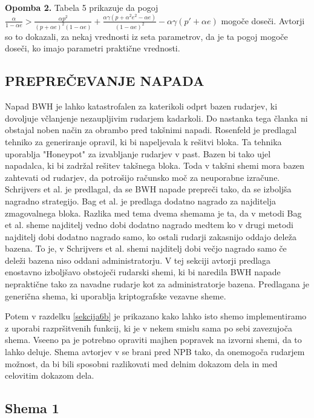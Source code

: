 \documentclass{acm_proc_article-sp}
\begin{document}
\textbf{Opomba 2.} Tabela 5 prikazuje da pogoj \textit{$\frac{\alpha}{1-\alpha e} > \frac{\alpha p^2}{(p+\alpha e)^2(1-\alpha e)} + \frac{\alpha\gamma(p+\alpha^2e^2-\alpha e)}{(1-\alpha e)^2} - \alpha\gamma(p' +\alpha e)$} mogoče doseči. Avtorji so to dokazali, za nekaj vrednosti iz seta parametrov, da je ta pogoj mogoče doseči, ko imajo parametri praktične vrednosti.

\subsection{PREPREČEVANJE NAPADA}

Napad BWH je lahko katastrofalen za katerikoli odprt bazen rudarjev, ki dovoljuje včlanjenje nezaupljivim rudarjem kadarkoli. Do nastanka tega članka ni obstajal noben način za obrambo pred takšnimi napadi. Rosenfeld \cite{analysisofbitcoin} je predlagal tehniko za generiranje opravil, ki bi napeljevala k rešitvi bloka. Ta tehnika uporablja "Honeypot" za izvabljanje  rudarjev v past. Bazen bi tako ujel napadalca, ki bi zadržal rešitev takšnega bloka. Toda v takšni shemi mora bazen zahtevati od rudarjev, da potrošijo računsko moč za neuporabne izračune. Schrijvers et al. \cite{incentivecompabiliti} je  predlagal, da se BWH napade prepreči tako, da se izboljša nagradno strategijo. Bag et al. \cite{noteonblockattack} je predlaga dodatno nagrado za najditelja zmagovalnega bloka. Razlika med tema dvema shemama je ta, da v metodi Bag et al. sheme najditelj vedno dobi dodatno nagrado medtem ko v drugi metodi najditelj dobi dodatno nagrado samo, ko ostali rudarji zakasnijo oddajo deleža bazena. To je, v Schrijvers et al. shemi najditelj dobi večjo nagrado samo če deleži bazena niso oddani administratorju. V tej sekciji avtorji predlaga enostavno izboljšavo obstoječi rudarski shemi, ki bi naredila BWH napade nepraktične tako za navadne rudarje kot za administratorje bazena. Predlagana je generična shema, ki uporablja kriptografske vezavne sheme.

Potem v razdelku \ref{sekcija6b} je prikazano kako lahko isto shemo implementiramo z uporabi razpršitvenih funkcij, ki je v nekem smislu sama po sebi zavezujoča shema. Vseeno pa je potrebno opraviti majhen popravek na izvorni shemi, da to lahko deluje. Shema avtorjev v \cite{originalarticle} se brani pred NPB tako, da onemogoča rudarjem možnost, da bi bili sposobni razlikovati med delnim dokazom dela in med celovitim dokazom dela.

\newpage
\subsection{Shema 1} \label{sekcija6a}
\end{document}
